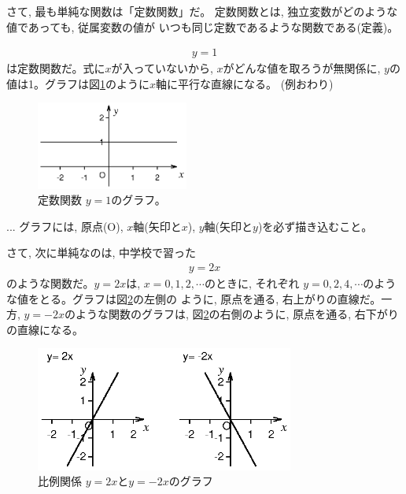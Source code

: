 さて, 最も単純な関数は「定数関数」だ。
定数関数とは, 独立変数がどのような値であっても, 従属変数の値が
いつも同じ定数であるような関数である(定義)。
\begin{exmpl} 
\begin{eqnarray}y=1\label{eq:ex_constfunc1}\end{eqnarray}
は定数関数だ。式に$x$が入っていないから, $x$がどんな値を取ろうが無関係に, 
$y$の値は1。グラフは図\ref{fig:const}のように$x$軸に平行な直線になる。
(例おわり)
\begin{figure}[h]
    \centering
    \includegraphics[width=5cm]{const.eps}
    \caption{定数関数 $y=1$のグラフ。}\label{fig:const}
\end{figure}\end{exmpl}\mv
\begin{freqmiss}{\small{}
... グラフには, 原点(O), $x$軸(矢印と$x$), $y$軸(矢印と$y$)を必ず描き込むこと。}\end{freqmiss}

さて, 次に単純なのは, 中学校で習った
\begin{eqnarray}y=2x\label{eq:ex_propfunc2}\end{eqnarray}
のような関数だ。$y=2x$は, $x=0, 1, 2, \cdots$のときに, それぞれ
$y=0, 2, 4, \cdots$のような値をとる。グラフは図\ref{fig:proportion}の左側の
ように, 原点を通る, 右上がりの直線だ。一方, $y=-2x$のような関数のグラフは, 
図\ref{fig:proportion}の右側のように, 原点を通る, 右下がりの直線になる。
\begin{figure}[h]
    \centering
    \includegraphics[width=8.5cm]{proportion.eps}
    \caption{比例関係 $y=2x$と$y=-2x$のグラフ}\label{fig:proportion}
\end{figure}

